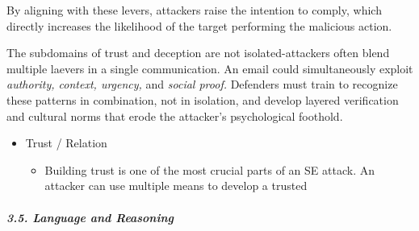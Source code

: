 {By aligning with these levers, attackers raise the intention to comply, which directly increases the likelihood of the target performing the malicious action.

The subdomains of trust and deception are not isolated-attackers often blend multiple laevers in a single communication. An email could simultaneously exploit \textit{authority, context, urgency,} and \textit{social proof.} Defenders must train to recognize these patterns in combination, not in isolation, and develop layered verification and cultural norms that erode the attacker's psychological foothold.


\begin{itemize}
    \item Trust / Relation
    \begin{itemize}
        \item Building trust is one of the most crucial parts of an SE attack. An attacker can use multiple means to develop a trusted
    \end{itemize}
\end{itemize}








\paragraph{\textit{3.5. Language and Reasoning}}

}
